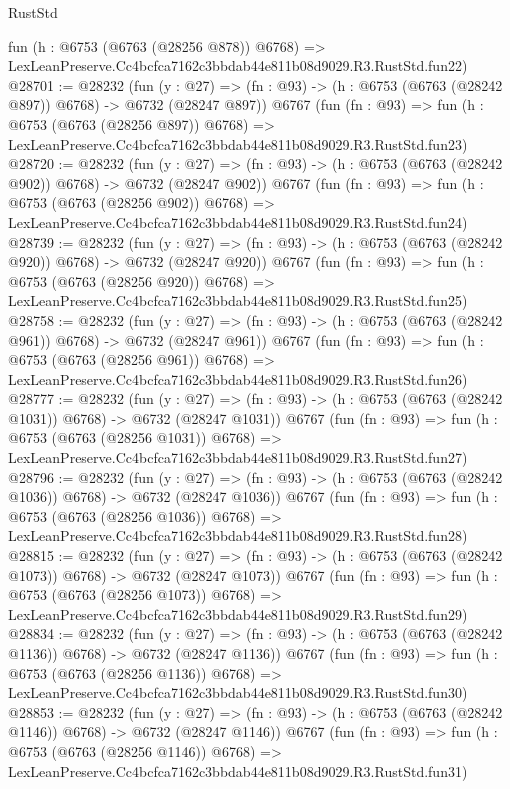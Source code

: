 \begin{lexlean}{RustStd}
\begin{coremodule}
    fun (h : @6753 (@6763 (@28256 @878)) @6768) =>
    LexLeanPreserve.Cc4bcfca7162c3bbdab44e811b08d9029.R3.RustStd.fun22)
@28701 := @28232
    (fun (y : @27) => (fn : @93) -> (h : @6753 (@6763 (@28242 @897)) @6768) -> @6732 (@28247 @897))
    @6767
    (fun (fn : @93) =>
    fun (h : @6753 (@6763 (@28256 @897)) @6768) =>
    LexLeanPreserve.Cc4bcfca7162c3bbdab44e811b08d9029.R3.RustStd.fun23)
@28720 := @28232
    (fun (y : @27) => (fn : @93) -> (h : @6753 (@6763 (@28242 @902)) @6768) -> @6732 (@28247 @902))
    @6767
    (fun (fn : @93) =>
    fun (h : @6753 (@6763 (@28256 @902)) @6768) =>
    LexLeanPreserve.Cc4bcfca7162c3bbdab44e811b08d9029.R3.RustStd.fun24)
@28739 := @28232
    (fun (y : @27) => (fn : @93) -> (h : @6753 (@6763 (@28242 @920)) @6768) -> @6732 (@28247 @920))
    @6767
    (fun (fn : @93) =>
    fun (h : @6753 (@6763 (@28256 @920)) @6768) =>
    LexLeanPreserve.Cc4bcfca7162c3bbdab44e811b08d9029.R3.RustStd.fun25)
@28758 := @28232
    (fun (y : @27) => (fn : @93) -> (h : @6753 (@6763 (@28242 @961)) @6768) -> @6732 (@28247 @961))
    @6767
    (fun (fn : @93) =>
    fun (h : @6753 (@6763 (@28256 @961)) @6768) =>
    LexLeanPreserve.Cc4bcfca7162c3bbdab44e811b08d9029.R3.RustStd.fun26)
@28777 := @28232
    (fun (y : @27) =>
    (fn : @93) -> (h : @6753 (@6763 (@28242 @1031)) @6768) -> @6732 (@28247 @1031))
    @6767
    (fun (fn : @93) =>
    fun (h : @6753 (@6763 (@28256 @1031)) @6768) =>
    LexLeanPreserve.Cc4bcfca7162c3bbdab44e811b08d9029.R3.RustStd.fun27)
@28796 := @28232
    (fun (y : @27) =>
    (fn : @93) -> (h : @6753 (@6763 (@28242 @1036)) @6768) -> @6732 (@28247 @1036))
    @6767
    (fun (fn : @93) =>
    fun (h : @6753 (@6763 (@28256 @1036)) @6768) =>
    LexLeanPreserve.Cc4bcfca7162c3bbdab44e811b08d9029.R3.RustStd.fun28)
@28815 := @28232
    (fun (y : @27) =>
    (fn : @93) -> (h : @6753 (@6763 (@28242 @1073)) @6768) -> @6732 (@28247 @1073))
    @6767
    (fun (fn : @93) =>
    fun (h : @6753 (@6763 (@28256 @1073)) @6768) =>
    LexLeanPreserve.Cc4bcfca7162c3bbdab44e811b08d9029.R3.RustStd.fun29)
@28834 := @28232
    (fun (y : @27) =>
    (fn : @93) -> (h : @6753 (@6763 (@28242 @1136)) @6768) -> @6732 (@28247 @1136))
    @6767
    (fun (fn : @93) =>
    fun (h : @6753 (@6763 (@28256 @1136)) @6768) =>
    LexLeanPreserve.Cc4bcfca7162c3bbdab44e811b08d9029.R3.RustStd.fun30)
@28853 := @28232
    (fun (y : @27) =>
    (fn : @93) -> (h : @6753 (@6763 (@28242 @1146)) @6768) -> @6732 (@28247 @1146))
    @6767
    (fun (fn : @93) =>
    fun (h : @6753 (@6763 (@28256 @1146)) @6768) =>
    LexLeanPreserve.Cc4bcfca7162c3bbdab44e811b08d9029.R3.RustStd.fun31)

\end{coremodule}
\end{lexlean}
